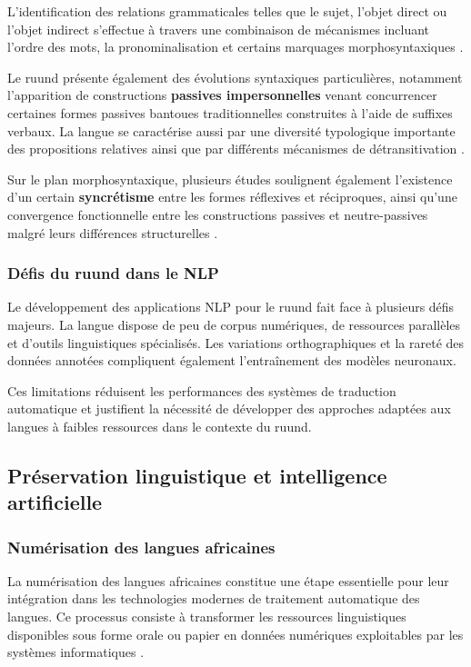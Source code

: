 L'identification des relations grammaticales telles que le sujet, l'objet direct ou l'objet indirect s'effectue à travers une combinaison de mécanismes incluant l'ordre des mots, la pronominalisation et certains marquages morphosyntaxiques \cite{kawasha2003lunda}.

Le ruund présente également des évolutions syntaxiques particulières, notamment l'apparition de constructions \textbf{passives impersonnelles} venant concurrencer certaines formes passives bantoues traditionnelles construites à l'aide de suffixes verbaux. La langue se caractérise aussi par une diversité typologique importante des propositions relatives ainsi que par différents mécanismes de détransitivation \cite{kawasha2003lunda}.

Sur le plan morphosyntaxique, plusieurs études soulignent également l'existence d'un certain \textbf{syncrétisme} entre les formes réflexives et réciproques, ainsi qu'une convergence fonctionnelle entre les constructions passives et neutre-passives malgré leurs différences structurelles \cite{kasombo2016structure, kawasha2003lunda}.

\subsubsection{Défis du ruund dans le NLP}

Le développement des applications \ac{NLP} pour le ruund fait face à plusieurs défis majeurs. La langue dispose de peu de corpus numériques, de ressources parallèles et d'outils linguistiques spécialisés. Les variations orthographiques et la rareté des données annotées compliquent également l'entraînement des modèles neuronaux.

Ces limitations réduisent les performances des systèmes de traduction automatique et justifient la nécessité de développer des approches adaptées aux langues à faibles ressources dans le contexte du ruund.

\subsection{Préservation linguistique et intelligence artificielle}

\subsubsection{Numérisation des langues africaines}

La numérisation des langues africaines constitue une étape essentielle pour leur intégration dans les technologies modernes de traitement automatique des langues. Ce processus consiste à transformer les ressources linguistiques disponibles sous forme orale ou papier en données numériques exploitables par les systèmes informatiques \cite{agyei2024low, mandiya2026lingala}.

